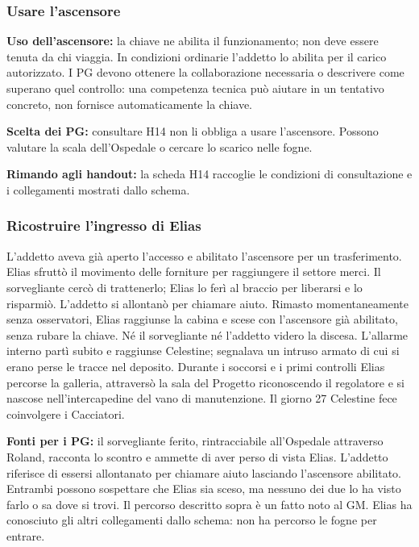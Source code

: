 \documentclass[11pt,a4paper]{article}
\begin{document}
\subsubsection{Usare l'ascensore}
\textbf{Uso dell'ascensore:} la chiave ne abilita il funzionamento; non deve essere tenuta da chi viaggia. In condizioni ordinarie l'addetto lo abilita per il carico autorizzato. I PG devono ottenere la collaborazione necessaria o descrivere come superano quel controllo: una competenza tecnica può aiutare in un tentativo concreto, non fornisce automaticamente la chiave.

\textbf{Scelta dei PG:} consultare H14 non li obbliga a usare l'ascensore. Possono valutare la scala dell'Ospedale o cercare lo scarico nelle fogne.

\textbf{Rimando agli handout:} la scheda H14 raccoglie le condizioni di consultazione e i collegamenti mostrati dallo schema.

\subsubsection{Ricostruire l'ingresso di Elias}
L'addetto aveva già aperto l'accesso e abilitato l'ascensore per un trasferimento. Elias sfruttò il movimento delle forniture per raggiungere il settore merci. Il sorvegliante cercò di trattenerlo; Elias lo ferì al braccio per liberarsi e lo risparmiò. L'addetto si allontanò per chiamare aiuto. Rimasto momentaneamente senza osservatori, Elias raggiunse la cabina e scese con l'ascensore già abilitato, senza rubare la chiave. Né il sorvegliante né l'addetto videro la discesa. L'allarme interno partì subito e raggiunse Celestine; segnalava un intruso armato di cui si erano perse le tracce nel deposito. Durante i soccorsi e i primi controlli Elias percorse la galleria, attraversò la sala del Progetto riconoscendo il regolatore e si nascose nell'intercapedine del vano di manutenzione. Il giorno 27 Celestine fece coinvolgere i Cacciatori.

\textbf{Fonti per i PG:} il sorvegliante ferito, rintracciabile all'Ospedale attraverso Roland, racconta lo scontro e ammette di aver perso di vista Elias. L'addetto riferisce di essersi allontanato per chiamare aiuto lasciando l'ascensore abilitato. Entrambi possono sospettare che Elias sia sceso, ma nessuno dei due lo ha visto farlo o sa dove si trovi. Il percorso descritto sopra è un fatto noto al GM. Elias ha conosciuto gli altri collegamenti dallo schema: non ha percorso le fogne per entrare.
\end{document}
